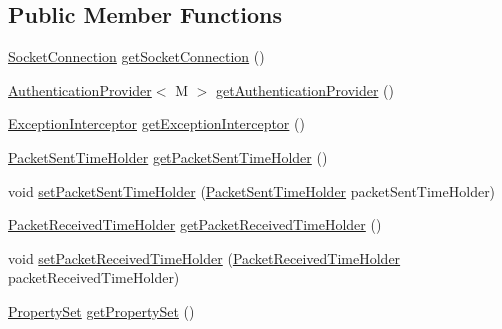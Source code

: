 \subsection*{Public Member Functions}
\begin{DoxyCompactItemize}
\item 
\mbox{\hyperlink{interfacecom_1_1mysql_1_1cj_1_1protocol_1_1_socket_connection}{Socket\+Connection}} \mbox{\hyperlink{classcom_1_1mysql_1_1cj_1_1protocol_1_1_abstract_protocol_a362f267df93632ef543be7d6f4cc13ba}{get\+Socket\+Connection}} ()
\item 
\mbox{\hyperlink{interfacecom_1_1mysql_1_1cj_1_1protocol_1_1_authentication_provider}{Authentication\+Provider}}$<$ M $>$ \mbox{\hyperlink{classcom_1_1mysql_1_1cj_1_1protocol_1_1_abstract_protocol_ad65b18b49a9f5c11968f0a5eddb54b75}{get\+Authentication\+Provider}} ()
\item 
\mbox{\hyperlink{interfacecom_1_1mysql_1_1cj_1_1exceptions_1_1_exception_interceptor}{Exception\+Interceptor}} \mbox{\hyperlink{classcom_1_1mysql_1_1cj_1_1protocol_1_1_abstract_protocol_a2ff358e0164a46cca88e99033bccfe41}{get\+Exception\+Interceptor}} ()
\item 
\mbox{\hyperlink{interfacecom_1_1mysql_1_1cj_1_1protocol_1_1_packet_sent_time_holder}{Packet\+Sent\+Time\+Holder}} \mbox{\hyperlink{classcom_1_1mysql_1_1cj_1_1protocol_1_1_abstract_protocol_aebcc61f81c539b41f5128d5fe2eee980}{get\+Packet\+Sent\+Time\+Holder}} ()
\item 
void \mbox{\hyperlink{classcom_1_1mysql_1_1cj_1_1protocol_1_1_abstract_protocol_a87fcaa5c3330747080a8f697672ab1ee}{set\+Packet\+Sent\+Time\+Holder}} (\mbox{\hyperlink{interfacecom_1_1mysql_1_1cj_1_1protocol_1_1_packet_sent_time_holder}{Packet\+Sent\+Time\+Holder}} packet\+Sent\+Time\+Holder)
\item 
\mbox{\hyperlink{interfacecom_1_1mysql_1_1cj_1_1protocol_1_1_packet_received_time_holder}{Packet\+Received\+Time\+Holder}} \mbox{\hyperlink{classcom_1_1mysql_1_1cj_1_1protocol_1_1_abstract_protocol_a025a0ac5b57d98c04099b14d92a1ecc4}{get\+Packet\+Received\+Time\+Holder}} ()
\item 
void \mbox{\hyperlink{classcom_1_1mysql_1_1cj_1_1protocol_1_1_abstract_protocol_a291f8eb4df14bd41f3f22f2c197ff4e5}{set\+Packet\+Received\+Time\+Holder}} (\mbox{\hyperlink{interfacecom_1_1mysql_1_1cj_1_1protocol_1_1_packet_received_time_holder}{Packet\+Received\+Time\+Holder}} packet\+Received\+Time\+Holder)
\item 
\mbox{\hyperlink{interfacecom_1_1mysql_1_1cj_1_1conf_1_1_property_set}{Property\+Set}} \mbox{\hyperlink{classcom_1_1mysql_1_1cj_1_1protocol_1_1_abstract_protocol_af644579d6c79c5fce484b19f18ff70aa}{get\+Property\+Set}} ()

\end{DoxyCompactItemize}
